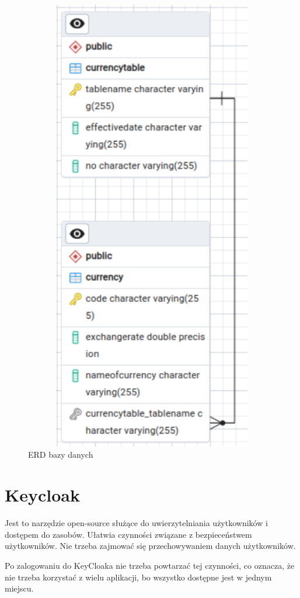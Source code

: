\documentclass{iiuwb}
\begin{document}
\begin{figure}[!h]
\centering
\includegraphics[width=12cm, height=20cm]{ERD.pdf}
\caption{ERD bazy danych}
\label{fig: ERD bazy danych}
\end{figure}

\section{Keycloak}
\label{sec:Keycloak}

Jest to narzędzie open-source służące do uwierzytelniania użytkowników i dostępem do zasobów. Ułatwia czynności związane z bezpieceństwem użytkowników. Nie trzeba zajmować się przechowywaniem danych użytkowników. 

Po zalogowaniu do KeyCloaka nie trzeba powtarzać tej czynności, co oznacza, że nie trzeba korzystać z wielu aplikacji, bo wszystko dostępne jest w jednym miejscu.
\end{document}
